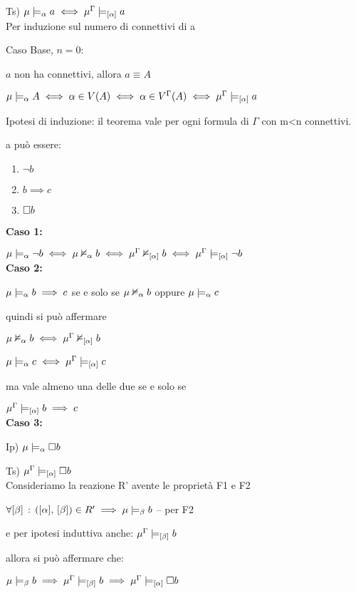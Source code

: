 Ts) $\mu\models_{\alpha}a\iff\mu^{\Gamma}\models_{[\alpha]}a$\\


Per induzione sul numero di connettivi di a

Caso Base, $n=0$:

$a$ non ha connettivi, allora $a\equiv A$

$\mu\models_{\alpha}A\iff\alpha\in V(A)\iff\alpha\in V^{\Gamma}(A)\iff\mu^{\Gamma}\models_{[\alpha]}a$

Ipotesi di induzione: il teorema vale per ogni formula di $\Gamma$
con m<n connettivi.

a può essere:
\begin{enumerate}
\item $\neg b$
\item $b\implies c$
\item $\square b$
\end{enumerate}
\textbf{Caso 1:}

$\mu\models_{\alpha}\neg b\iff\mu\nvDash_{\alpha}b\iff\mu^{\Gamma}\nvDash_{[\alpha]}b\iff\mu^{\Gamma}\models_{[\alpha]}\neg b$\\


\textbf{Caso 2:}

$\mu\models_{\alpha}b\implies c$ se e solo se $\mu\nvDash_{\alpha}b$
oppure $\mu\models_{\alpha}c$

quindi si può affermare

$\mu\nvDash_{\alpha}b\iff\mu^{\Gamma}\nvDash_{[\alpha]}b$

$\mu\models_{\alpha}c\iff\mu^{\Gamma}\models_{[\alpha]}c$

ma vale almeno una delle due se e solo se

$\mu^{\Gamma}\models_{[\alpha]}b\implies c$\\


\textbf{Caso 3:}

Ip) $\mu\models_{\alpha}\square b$

Ts) $\mu^{\Gamma}\models_{[\alpha]}\square b$\\


Consideriamo la reazione R' avente le proprietà F1 e F2

$\forall[\beta]\,:\,([\alpha],\,[\beta])\in R'\implies\mu\models_{\beta}b$
-- per F2

e per ipotesi induttiva anche: $\mu^{\Gamma}\models_{[\beta]}b$

allora si può affermare che:

$\mu\models_{\beta}b\implies\mu^{\Gamma}\models_{[\beta]}b\implies\mu^{\Gamma}\models_{[\alpha]}\square b$\\


